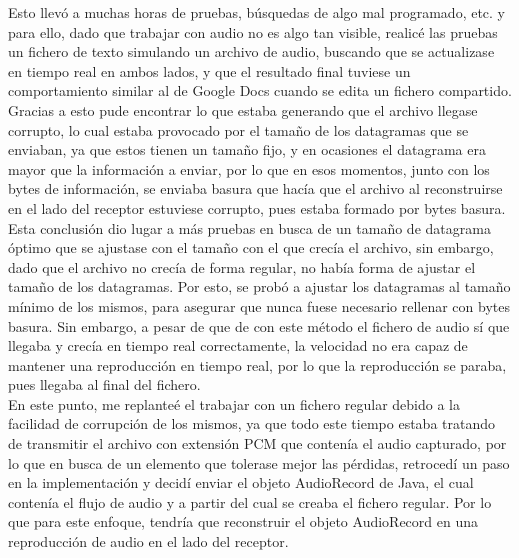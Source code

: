 Esto llevó a muchas horas de pruebas, búsquedas de algo mal programado, etc. y
para ello, dado que trabajar con audio no es algo tan visible, realicé las
pruebas un fichero de texto simulando un archivo de audio, buscando que se
actualizase en tiempo real en ambos lados, y que el resultado final tuviese un
comportamiento similar al de Google Docs cuando se edita un fichero compartido.
Gracias a esto pude encontrar lo que estaba generando que el archivo llegase
corrupto, lo cual estaba provocado por el tamaño de los datagramas que se
enviaban, ya que estos tienen un tamaño fijo, y en ocasiones el datagrama era
mayor que la información a enviar, por lo que en esos momentos, junto con los
bytes de información, se enviaba basura que hacía que el archivo al
reconstruirse en el lado del receptor estuviese corrupto, pues estaba formado
por bytes basura.\\

Esta conclusión dio lugar a más pruebas en busca de un tamaño de datagrama
óptimo que se ajustase con el tamaño con el que crecía el archivo, sin embargo,
dado que el archivo no crecía de forma regular, no había forma de ajustar el
tamaño de los datagramas. Por esto, se probó a ajustar los datagramas al tamaño
mínimo de los mismos, para asegurar que nunca fuese  necesario rellenar con
bytes basura. Sin embargo, a pesar de que de con este método el fichero de audio sí
que llegaba y crecía en tiempo real correctamente, la velocidad no era capaz
de mantener una reproducción en tiempo real, por lo que la reproducción se
paraba, pues llegaba al final del fichero.\\

En este punto, me replanteé el trabajar con un fichero regular debido a la
facilidad de corrupción de los mismos, ya que todo este tiempo estaba tratando
de transmitir el archivo con extensión PCM que contenía el audio capturado, por
lo que en busca de un elemento que tolerase mejor las pérdidas, retrocedí un
paso en la implementación y decidí enviar el objeto AudioRecord de Java, el cual
contenía el flujo de audio y a partir del cual se creaba el fichero regular. Por
lo que para este enfoque, tendría que reconstruir el objeto AudioRecord en una
reproducción de audio en el lado del receptor.\\


